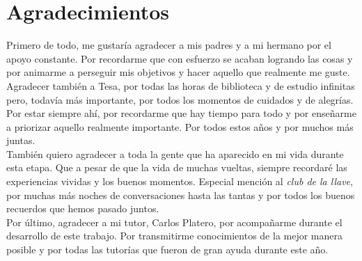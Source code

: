 \chapter{Agradecimientos}
Primero de todo, me gustaría agradecer a mis padres y a mi hermano por el apoyo constante. Por recordarme que con esfuerzo se acaban logrando las cosas y por animarme a perseguir mis objetivos y hacer aquello que realmente me guste.\\

Agradecer también a Tesa, por todas las horas de biblioteca y de estudio infinitas pero, todavía más importante, por todos los momentos de cuidados y de alegrías. Por estar siempre ahí, por recordarme que  hay tiempo para todo y por enseñarme a priorizar aquello realmente importante. Por todos estos años y por muchos más juntas.\\

También quiero agradecer a toda la gente que ha aparecido en mi vida durante esta etapa. Que a pesar de que la vida de muchas vueltas, siempre recordaré las experiencias vividas y los buenos momentos. Especial mención al \textit{club de la llave}, por muchas más noches de conversaciones hasta las tantas y por todos los buenos recuerdos que hemos pasado juntos.\\

Por último, agradecer a mi tutor, Carlos Platero, por acompañarme durante el desarrollo de este trabajo. Por transmitirme conocimientos de la mejor manera posible y por todas las tutorías que fueron de gran ayuda durante este año.

